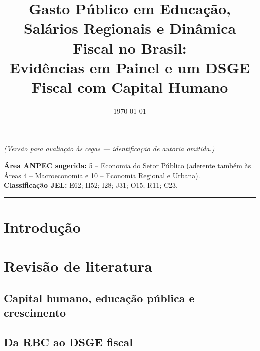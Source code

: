 \documentclass[12pt,a4paper]{article}
\title{\textbf{Gasto P\'ublico em Educa\c{c}\~ao, Sal\'arios Regionais e Din\^amica Fiscal no Brasil:}\\[2pt]
\textbf{\large Evid\^encias em Painel e um DSGE Fiscal com Capital Humano}}
\author{}
\date{\today}
\begin{document}
\maketitle
\begin{center}\small\textit{(Vers\~ao para avalia\c{c}\~ao \`as cegas --- identifica\c{c}\~ao de autoria omitida.)}\end{center}

\begin{center}
\small \textbf{\'Area ANPEC sugerida:} 5 -- Economia do Setor P\'ublico (aderente tamb\'em \`as \'Areas 4 -- Macroeconomia e 10 -- Economia Regional e Urbana). \\
\textbf{Classifica\c{c}\~ao JEL:} E62; H52; I28; J31; O15; R11; C23.
\end{center}

\begin{abstract}
\end{abstract}

\begin{center}\rule{0.6\textwidth}{0.3pt}\end{center}

\section{Introdu\c{c}\~ao}

\section{Revis\~ao de literatura}
\subsection{Capital humano, educa\c{c}\~ao p\'ublica e crescimento}

\subsection{Da RBC ao DSGE fiscal}
\end{document}
